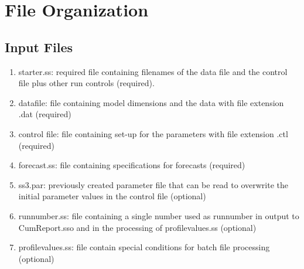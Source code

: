 		
\section{File Organization}\label{FileOrganization}		
	\subsection{Input Files}
	\begin{enumerate}
		\item starter.ss:   required file containing filenames of the data file and the control file plus other run controls (required).
		\item datafile:  file containing model dimensions and the data with file extension .dat (required)
		\item control file:  file containing set-up for the parameters with file extension .ctl (required)
		\item forecast.ss:  file containing specifications for forecasts (required) 
		\item ss3.par:  previously created parameter file that can be read to overwrite the initial parameter values in the control file (optional)
		\item runnumber.ss:  file containing a single number used as runnumber in output to CumReport.sso and in the processing of profilevalues.ss (optional)
		\item profilevalues.ss:  file contain special conditions for batch file processing (optional)
	\end{enumerate}
	
